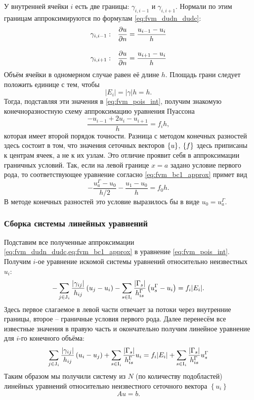 У внутренней ячейки $i$ есть две границы: $\gamma_{i,i-1}$ и $\gamma_{i,i+1}$.
Нормали по этим границам аппроксимируются по формулам \cref{eq:fvm_dudn_dudc}:
\begin{align*}
\gamma_{i,i-1}: \quad& \frac{\partial u}{\partial n} = \frac{u_{i-1}-u_{i}}{h} \\[10pt]
\gamma_{i,i+1}: \quad& \frac{\partial u}{\partial n} = \frac{u_{i+1}-u_{i}}{h}
\end{align*}
Объём ячейки в одномерном случае равен её длине $h$.
Площадь грани следует положить единице с тем, чтобы
$$
|E_i| = |\gamma| h = h.
$$
Тогда, подставляя эти значения в \cref{eq:fvm_pois_int},
получим знакомую конечноразностную схему аппроксимацию уравнения Пуассона
$$
\frac{-u_{i-1} + 2 u_i - u_{i+1}}{h} = f_i h,
$$
которая имеет второй порядок точности.
Разница с методом конечных разностей здесь состоит в том,
что значения сеточных векторов $\left\{u\right\}$, $\left\{f\right\}$ здесь
приписаны к центрам ячеек, а не к их узлам.
Это отличие проявит себя в аппроксимации граничных условий.
Так, если на левой границе $x=a$ задано условие первого рода, то соответствующее уравнение
согласно \cref{eq:fvm_bc1_approx}
примет вид
$$
-\frac{u^\Gamma_a - u_0}{h/2} - \frac{u_1 - u_0}{h} = f_0 h.
$$
В методе конечных разностей это условие выразилось бы в виде $u_0 = u^\Gamma_a$.

\subsubsection{Сборка системы линейных уравнений}
Подставим все полученные аппроксимации
\cref{eq:fvm_dudn_dudc,eq:fvm_bc1_approx}
в уравнение \cref{eq:fvm_pois_int}. Получим $i$-ое уравнение искомой системы уравнений относительно неизвестных $u_i$:
\begin{equation*}
-\sum_{j\in {\rm J}_i}
    \frac{|\gamma_{ij}|}{h_{ij}}
         \left(u_j - u_i\right)
-\sum_{s\in{\rm I}_i}
    \frac{|\Gamma_{s}|}{h^\Gamma_{is}}
        \left(u^\Gamma_s - u_i\right)
=
f_i |E_i|.
\end{equation*}
Здесь первое слагаемое в левой части отвечает за потоки через внутренние границы,
второе -- граничные условия первого рода.
Далее перенесём все известные значения в правую часть и окончательно
получим линейное уравнение для $i$-го конечного объёма:
\begin{equation}
\label{eq:fvm_slae}
\sum_{j\in{\rm J}_i}
    \frac{|\gamma_{ij}|}{h_{ij}}
         \left(u_i - u_j\right)
+\sum_{s\in{\rm I}_i}
    \frac{|\Gamma_{s}|}{h^\Gamma_{is}}u_i
 =
f_i |E_i|
+\sum_{s\in{\rm I}_i}
    \frac{|\Gamma_{s}|}{h^\Gamma_{is}} u_s^\Gamma
\end{equation}
Таким образом мы получили систему из $N$ (по количеству подобластей) линейных уравнений относительно
неизвестного сеточного вектора $\left\{u_i\right\}$
$$
A u = b.
$$

